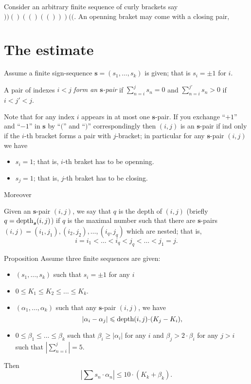 \documentclass[a4paper,10pt]{amsart}
\begin{document}
Consider an arbitrary finite sequence of curly brackets say $))()(()(()))(($.
An openning braket may come with a closing pair,

\section{The estimate}

Assume a finite  sign-sequence $\bm{s}=(s_1,\dots, s_k)$
is given;
that is $s_i=\pm1$ for $i$.

A pair of indexes $i< j$
\emph{form an $\bm{s}$-pair} 
if $\sum_{n=i}^js_n=0$ and $\sum_{n=i}^{j'}s_n>0$ if $i<j'<j$.

Note that for any index $i$ appears in at most one $\bm{s}$-pair.
If you exchange ``$+1$'' and ``$-1$'' in $\bm{s}$ by ``$($'' and ``$)$'' correspondingly then $(i,j)$ is an $\bm{s}$-pair
if ind only if the $i$-th bracket forms a pair with $j$-bracket;
in particular for any $\bm{s}$-pair $(i,j)$ we have
\begin{itemize}
\item $s_i=1$; that is, $i$-th braket has to be openning.
 \item $s_j=1$; that is, $j$-th braket has to be closing.
\end{itemize}
Moreover 


Given an $\bm{s}$-pair $(i,j)$, 
we say that $q$ is the depth of $(i,j)$
(briefly $q=\mathop{\rm depth}\nolimits_{\bm{s}}(i,j)$) 
if $q$ is the maximal number such that there are $\bm{s}$-pairs 
$(i,j)=(i_1,j_1),(i_2,j_2),\dots,(i_q,j_q)$ which are nested; 
that is,
\[i=i_1<\dots<i_q<j_q<\dots<j_1=j.\]

\begin{thm}{Proposition}
Assume three finite sequences are given:
\begin{itemize}
\item $(s_1,\dots, s_k)$ such that $s_i=\pm1$ for any $i$
\item $0\le K_1\le K_2\le \dots\le K_k$.
\item $(\alpha_1,\dots,\alpha_k)$ such that any $\bm{s}$-pair $(i,j)$, we have
\[|\alpha_i-\alpha_j|\le \depth(i,j)\cdot(K_j-K_i),\]
\item $0\le \beta_1\le\dots\le\beta_k$ such that $\beta_i\ge |\alpha_i|$ for any $i$ and $\beta_j>2\cdot\beta_i$ for any $j>i$ such that $|\sum_{n=i}^j|=5$.
\end{itemize}
Then
\[|\sum s_n\cdot \alpha_n|\le 10\cdot( K_k+ \beta_k).\]

\end{thm}
\end{document}
